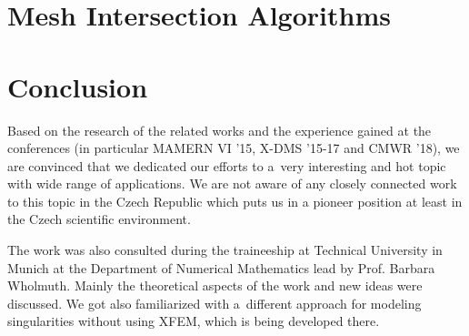\documentclass[bibliography=totocnumbered,dvipsnames,FM,Dis,EN]{tulthesis}
\begin{document}

\chapter{Mesh Intersection Algorithms} \label{chap:intersections}







\chapter{Conclusion} \label{chap:summary}


Based on the research of the related works and the experience gained at the conferences
(in particular MAMERN VI '15, X-DMS '15-17 and CMWR '18),
we are convinced that we dedicated our efforts to a~very interesting and hot topic with wide range of applications.
We are not aware of any closely connected work to this topic in the Czech Republic
which puts us in a pioneer position at least in the Czech scientific environment.



The work was also consulted during the traineeship at Technical University in Munich at the Department of Numerical Mathematics
lead by Prof. Barbara Wholmuth. Mainly the theoretical aspects of the work and new ideas were discussed.
We got also familiarized with a~different approach for modeling singularities without using XFEM, which is being developed there.


\end{document}
